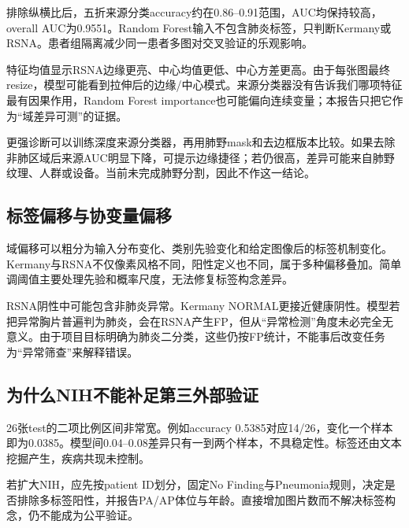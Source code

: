 排除纵横比后，五折来源分类accuracy约在0.86--0.91范围，AUC均保持较高，overall AUC为0.9551。Random Forest输入不包含肺炎标签，只判断Kermany或RSNA。患者组隔离减少同一患者多图对交叉验证的乐观影响。

特征均值显示RSNA边缘更亮、中心均值更低、中心方差更高。由于每张图最终resize，模型可能看到拉伸后的边缘/中心模式。来源分类器没有告诉我们哪项特征最有因果作用，Random Forest importance也可能偏向连续变量；本报告只把它作为“域差异可测”的证据。

更强诊断可以训练深度来源分类器，再用肺野mask和去边框版本比较。如果去除非肺区域后来源AUC明显下降，可提示边缘捷径；若仍很高，差异可能来自肺野纹理、人群或设备。当前未完成肺野分割，因此不作这一结论。

\subsection{标签偏移与协变量偏移}

域偏移可以粗分为输入分布变化、类别先验变化和给定图像后的标签机制变化。Kermany与RSNA不仅像素风格不同，阳性定义也不同，属于多种偏移叠加。简单调阈值主要处理先验和概率尺度，无法修复标签构念差异。

RSNA阴性中可能包含非肺炎异常。Kermany NORMAL更接近健康阴性。模型若把异常胸片普遍判为肺炎，会在RSNA产生FP，但从“异常检测”角度未必完全无意义。由于项目目标明确为肺炎二分类，这些仍按FP统计，不能事后改变任务为“异常筛查”来解释错误。

\subsection{为什么NIH不能补足第三外部验证}

26张test的二项比例区间非常宽。例如accuracy 0.5385对应14/26，变化一个样本即为0.0385。模型间0.04--0.08差异只有一到两个样本，不具稳定性。标签还由文本挖掘产生，疾病共现未控制。

若扩大NIH，应先按patient ID划分，固定No Finding与Pneumonia规则，决定是否排除多标签阳性，并报告PA/AP体位与年龄。直接增加图片数而不解决标签构念，仍不能成为公平验证。
